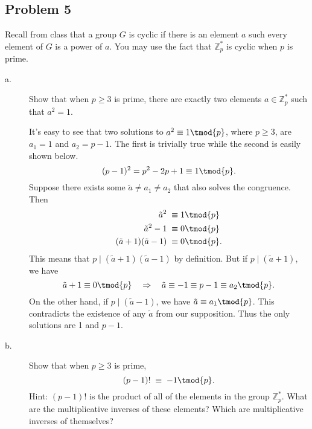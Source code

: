 \documentclass[../hw_sols.tex]{subfiles}
\begin{document}
\newpage



\subsection*{Problem 5}

Recall from class that a group $G$ is cyclic if there is an element $a$ such 
every element of $G$ is a power of $a$. You may use the fact that 
$\mathbb{Z}^*_p$ is cyclic when $p$ is prime.

\begin{description}

\item[a.] Show that when $p \geq 3$ is prime, there are exactly two elements 
$a \in \mathbb{Z}^*_p$ such that $a^2 = 1$.

\begin{solution}

It's easy to see that two solutions to $a^2 \equiv 1 \tmod{p}$, where 
$p \geq 3$, are $a_1 = 1$ and $a_2 = p - 1$. The first is trivially true while 
the second is easily shown below.
	$$(p-1)^2 = p^2 - 2p + 1 \equiv 1 \tmod{p}.$$
Suppose there exists some $\tilde{a} \neq a_1 \neq a_2$ that also solves the 
congruence. Then
\begin{align*}
	\tilde{a}^2 \; \equiv& \; 1 \tmod{p} \\
	\tilde{a}^2 - 1 \; \equiv& \; 0 \tmod{p} \\
	(\tilde{a} + 1)(\tilde{a} - 1) \; \equiv& \; 0 \tmod{p}.
\end{align*}
This means that $p \mid (\tilde{a} + 1)(\tilde{a} - 1)$ by definition. But if 
$p \mid (\tilde{a} + 1)$, we have
	$$\tilde{a} + 1 \equiv 0 \tmod{p} 
	\quad \Rightarrow \quad 
	\tilde{a} \equiv -1 \equiv p - 1 \equiv a_2 \tmod{p}.$$
On the other hand, if $p \mid (\tilde{a} - 1)$, we have 
$\tilde{a} \equiv a_1 \tmod{p}$. This contradicts the existence of any 
$\tilde{a}$ from our supposition. Thus the only solutions are 1 and $p-1$.

\end{solution}

\item[b.] Show that when $p \geq 3$ is prime,
	$$(p - 1)! \; \equiv \; -1 \tmod{p}.$$
Hint: $(p - 1)!$ is the product of all of the elements in the group 
$\mathbb{Z}^*_p$. What are the multiplicative inverses of these elements? 
Which are multiplicative inverses of themselves?


\end{description}
\end{document}
